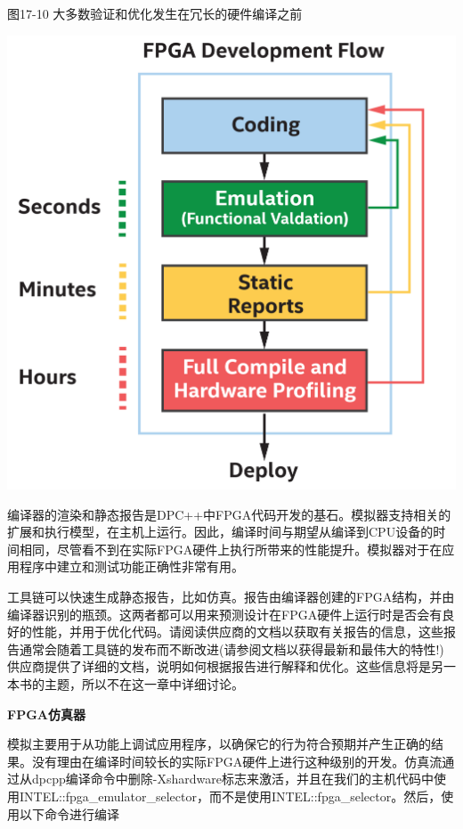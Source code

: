 \hspace*{\fill} \par %
图17-10 大多数验证和优化发生在冗长的硬件编译之前
\begin{center}
	\includegraphics[width=1.0\textwidth]{content/chapter-17/images/10}
\end{center}

编译器的渲染和静态报告是DPC++中FPGA代码开发的基石。模拟器支持相关的扩展和执行模型，在主机上运行。因此，编译时间与期望从编译到CPU设备的时间相同，尽管看不到在实际FPGA硬件上执行所带来的性能提升。模拟器对于在应用程序中建立和测试功能正确性非常有用。\par

工具链可以快速生成静态报告，比如仿真。报告由编译器创建的FPGA结构，并由编译器识别的瓶颈。这两者都可以用来预测设计在FPGA硬件上运行时是否会有良好的性能，并用于优化代码。请阅读供应商的文档以获取有关报告的信息，这些报告通常会随着工具链的发布而不断改进(请参阅文档以获得最新和最伟大的特性!)供应商提供了详细的文档，说明如何根据报告进行解释和优化。这些信息将是另一本书的主题，所以不在这一章中详细讨论。\par

\hspace*{\fill} \par %
\textbf{FPGA仿真器}

模拟主要用于从功能上调试应用程序，以确保它的行为符合预期并产生正确的结果。没有理由在编译时间较长的实际FPGA硬件上进行这种级别的开发。仿真流通过从dpcpp编译命令中删除-Xshardware标志来激活，并且在我们的主机代码中使用INTEL::fpga\_emulator\_selector，而不是使用INTEL::fpga\_selector。然后，使用以下命令进行编译\par

